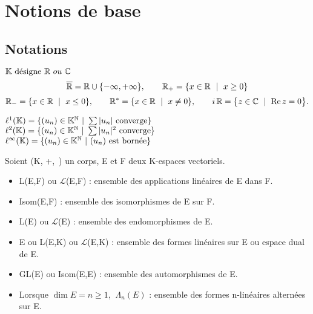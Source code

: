 \section{Notions de base}

\vspace{0.8cm}

\subsection{Notations}
\vspace{0.7cm}

\(\KK \ \text{désigne} \ \RR \ ou\ \CC\)
\[\overline{\mathbb{R}}=\mathbb{R} \cup  \{ -\infty,+\infty\}, \qquad \mathbb{R}_+ = \{ x\in \mathbb{R} \ \mid \ x\geq 0 \}\] 
\[\RR_- = \{ x\in \RR \ \mid \ x\leq 0 \}, \qquad \RR^* = \{ x\in \RR \ \mid \ x\neq 0 \},\qquad i\,\RR=\bigl\{z\in \CC \ \mid \ \text{Re}\,z=0\bigr\}. \]




\vspace{0.5cm}
\noindent
\(\ell^1(\KK)= \{ (u_n)\in \KK ^\NN \ | \ \sum |u_n| \ \text{converge}\}\)\vspace{0.2cm}\\
\(\ell^2(\mathbb{K})= \{ (u_n)\in \mathbb{K} ^{\mathbb{N}} \ | \ \sum |u_n|^2 \ \text{converge}\}\)\vspace{0.2cm}\\
\(\ell^\infty(\KK)= \{ (u_n)\in \KK ^\NN \ | \ (u_n) \ \text{est bornée}\}\)

\vspace{1cm}

Soient (K, +,\ \x) un corps, E et F deux K-espaces vectoriels.
\begin{itemize}[leftmargin=0cm, label=•]
    \item L(E,F) ou \(\mathscr{L}\)(E,F) : ensemble des applications linéaires de E dans F. 
    
    \item Isom(E,F) : ensemble des isomorphismes de E sur F.
    
    \item L(E) ou \(\mathscr{L} \)(E) : ensemble des endomorphismes de E.
    
    \item E\expo{*} ou L(E,K) ou \(\mathscr{L} \)(E,K) : ensemble des formes linéaires sur E ou espace dual de E.
    
    \item GL(E) ou Isom(E,E) : ensemble des automorphismes de E. 
    
    \item Lorsque \(\dim E=n\geq 1\), \(\ \Lambda_n(E)\) : ensemble des formes n-linéaires alternées sur E.
\end{itemize}

